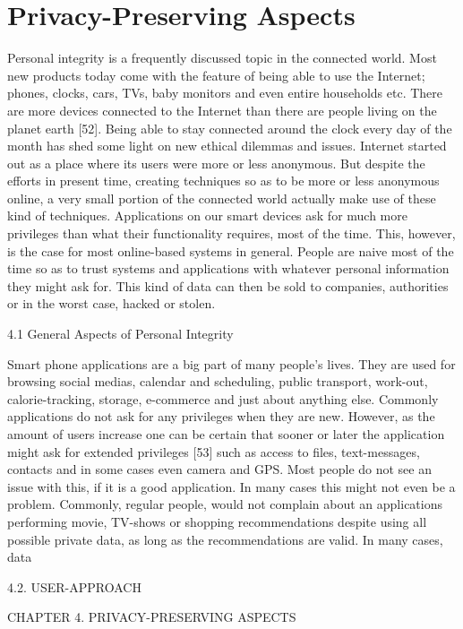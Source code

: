 \chapter{Privacy-Preserving Aspects}
Personal integrity is a frequently discussed topic in the connected world.
Most new products today come with the feature of being able to use the Internet; phones, clocks, cars, TVs, baby monitors and even entire households etc.
There are more devices connected to the Internet than there are people living on the planet earth [52]. Being able to stay connected around the clock every day of the month has shed some light on new ethical dilemmas and issues. Internet started out as a place where its users were more or less anonymous. But despite the efforts in present time, creating techniques so as to be more or less anonymous online, a very small portion of the connected world actually make use of these kind of techniques. Applications on our smart devices ask for much more privileges than what their functionality
requires, most of the time. This, however, is the case for most online-based systems in general. People are naive most of the time so as to trust systems and applications with whatever personal information they might ask for. This kind of data can then be sold to companies, authorities or in the worst case, hacked or stolen.

4.1
General Aspects of Personal Integrity

Smart phone applications are a big part of many people’s lives. They are used for browsing social medias, calendar and scheduling, public transport, work-out, calorie-tracking,
storage, e-commerce and just about anything else. Commonly applications do not ask
for any privileges when they are new. However, as the amount of users increase one
can be certain that sooner or later the application might ask for extended privileges [53]
such as access to files, text-messages, contacts and in some cases even camera and GPS.
Most people do not see an issue with this, if it is a good application. In many cases this
might not even be a problem. Commonly, regular people, would not complain about an
applications performing movie, TV-shows or shopping recommendations despite using
all possible private data, as long as the recommendations are valid. In many cases, data


4.2. USER-APPROACH

CHAPTER 4. PRIVACY-PRESERVING ASPECTS


